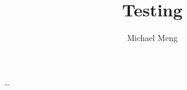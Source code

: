 \documentclass[11pt]{article}
\title{Testing}
\author{Michael Meng}
\begin{document}
\maketitle

…
\end{document}
